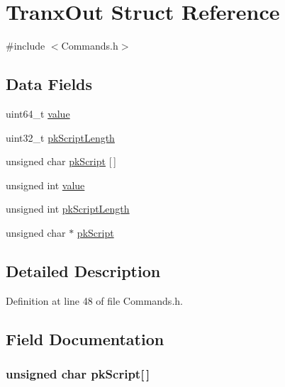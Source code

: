 \hypertarget{struct_tranx_out}{
\section{TranxOut Struct Reference}
\label{struct_tranx_out}
}


{\ttfamily \#include $<$Commands.h$>$}

\subsection*{Data Fields}
\begin{DoxyCompactItemize}
\item 
uint64\_\-t \hyperlink{struct_tranx_out_a4e630859cc0e2a22bd6acf39a6a8e218}{value}
\item 
uint32\_\-t \hyperlink{struct_tranx_out_a895859eb7d18cd9b6cb38c25ced2418e}{pkScriptLength}
\item 
unsigned char \hyperlink{struct_tranx_out_a57661961e62f14ddb90c75c2c130b041}{pkScript} \mbox{[}$\,$\mbox{]}
\item 
unsigned int \hyperlink{struct_tranx_out_a2a5a27690c40c531d0a8385dc4f66a95}{value}
\item 
unsigned int \hyperlink{struct_tranx_out_a12d43c2eb75d61a2698e5c78f2f6122c}{pkScriptLength}
\item 
unsigned char $\ast$ \hyperlink{struct_tranx_out_a1065be8e3e985afe6b60c410ca157d61}{pkScript}
\end{DoxyCompactItemize}


\subsection{Detailed Description}


Definition at line 48 of file Commands.h.



\subsection{Field Documentation}
\hypertarget{struct_tranx_out_a57661961e62f14ddb90c75c2c130b041}{
\subsubsection[{pkScript}]{\setlength{\rightskip}{0pt plus 5cm}unsigned char {\bf pkScript}\mbox{[}$\,$\mbox{]}}}
\label{struct_tranx_out_a57661961e62f14ddb90c75c2c130b041}


